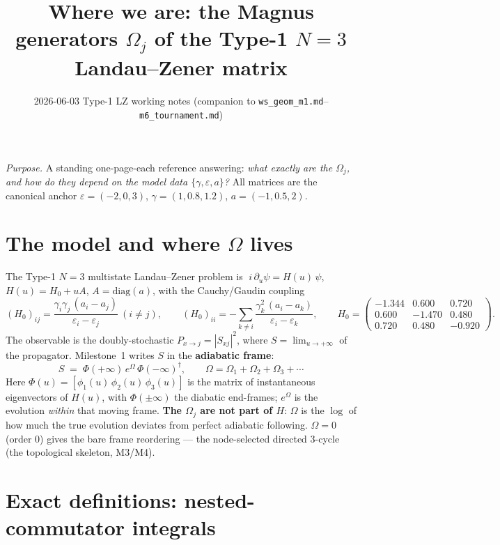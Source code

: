 \documentclass[11pt]{article}
\title{\vspace{-2.5em}\textbf{Where we are: the Magnus generators $\Omega_j$ of the Type-1 $N{=}3$ Landau--Zener matrix}}
\author{}
\date{2026-06-03 \;\textbar\; Type-1 LZ working notes (companion to \texttt{ws\_geom\_m1.md}--\texttt{m6\_tournament.md})}
\newcommand{\eps}{\varepsilon}
\begin{document}
\maketitle
\vspace{-3em}

\noindent\textit{Purpose.} A standing one-page-each reference answering: \emph{what exactly are the
$\Omega_j$, and how do they depend on the model data $\{\gamma,\eps,a\}$?} All matrices are the canonical
anchor $\eps=(-2,0,3)$, $\gamma=(1,0.8,1.2)$, $a=(-1,0.5,2)$.

\section{The model and where $\Omega$ lives}

The Type-1 $N{=}3$ multistate Landau--Zener problem is $\;i\,\partial_u\psi=H(u)\,\psi$, $H(u)=H_0+uA$,
$A=\mathrm{diag}(a)$, with the Cauchy/Gaudin coupling
\[
(H_0)_{ij}=\frac{\gamma_i\gamma_j\,(a_i-a_j)}{\eps_i-\eps_j}\ (i\neq j),
\qquad
(H_0)_{ii}=-\sum_{k\neq i}\frac{\gamma_k^2\,(a_i-a_k)}{\eps_i-\eps_k},
\qquad
H_0=\begin{pmatrix}-1.344&0.600&0.720\\0.600&-1.470&0.480\\0.720&0.480&-0.920\end{pmatrix}.
\]
The observable is the doubly-stochastic $P_{x\to j}=|S_{xj}|^2$, where $S=\lim_{u\to+\infty}$ of the
propagator. Milestone~1 writes $S$ in the \textbf{adiabatic frame}:
\[
\boxed{\;S \;=\; \Phi(+\infty)\,e^{\Omega}\,\Phi(-\infty)^\dagger,\qquad
\Omega=\Omega_1+\Omega_2+\Omega_3+\cdots\;}
\]
Here $\Phi(u)=[\phi_1(u)\,\phi_2(u)\,\phi_3(u)]$ is the matrix of instantaneous eigenvectors of $H(u)$, with
$\Phi(\pm\infty)$ the diabatic end-frames; $e^{\Omega}$ is the evolution \emph{within} that moving frame.
\textbf{The $\Omega_j$ are not part of $H$}: $\Omega$ is the $\log$ of how much the true evolution deviates
from perfect adiabatic following. $\Omega=0$ (order $0$) gives the bare frame reordering --- the
node-selected directed $3$-cycle (the topological skeleton, M3/M4).

\section{Exact definitions: nested-commutator integrals}
\end{document}
